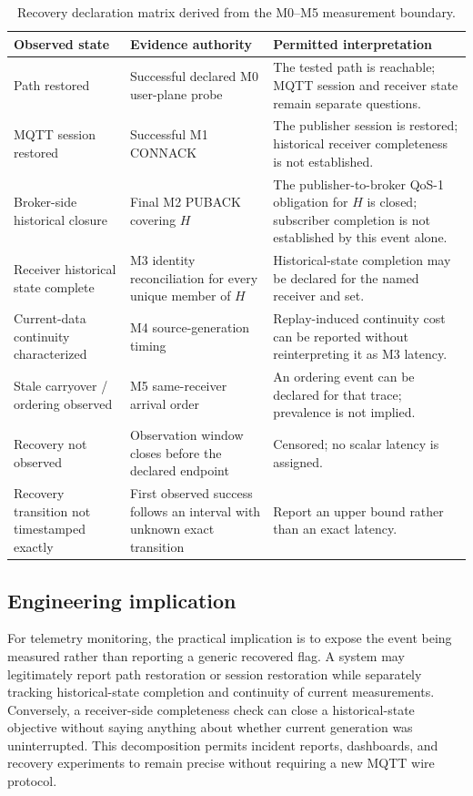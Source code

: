 \documentclass[journal]{IEEEtran}
\begin{document}
\begin{table}[t]
\centering
\small
\caption{Recovery declaration matrix derived from the M0--M5 measurement boundary.}
\label{tab:declaration}
\begin{tabular}{p{}p{}p{}}
\toprule
\textbf{Observed state} & \textbf{Evidence authority} & \textbf{Permitted interpretation} \\
\midrule
Path restored & Successful declared M0 user-plane probe & The tested path is reachable; MQTT session and receiver state remain separate questions. \\
MQTT session restored & Successful M1 CONNACK & The publisher session is restored; historical receiver completeness is not established. \\
Broker-side historical closure & Final M2 PUBACK covering $H$ & The publisher-to-broker QoS-1 obligation for $H$ is closed; subscriber completion is not established by this event alone. \\
Receiver historical state complete & M3 identity reconciliation for every unique member of $H$ & Historical-state completion may be declared for the named receiver and set. \\
Current-data continuity characterized & M4 source-generation timing & Replay-induced continuity cost can be reported without reinterpreting it as M3 latency. \\
Stale carryover / ordering observed & M5 same-receiver arrival order & An ordering event can be declared for that trace; prevalence is not implied. \\
Recovery not observed & Observation window closes before the declared endpoint & Censored; no scalar latency is assigned. \\
Recovery transition not timestamped exactly & First observed success follows an interval with unknown exact transition & Report an upper bound rather than an exact latency. \\
\bottomrule
\end{tabular}
\end{table}

\subsection{Engineering implication}

For telemetry monitoring, the practical implication is to expose the event being measured rather than reporting a generic recovered flag. A system may legitimately report path restoration or session restoration while separately tracking historical-state completion and continuity of current measurements. Conversely, a receiver-side completeness check can close a historical-state objective without saying anything about whether current generation was uninterrupted. This decomposition permits incident reports, dashboards, and recovery experiments to remain precise without requiring a new MQTT wire protocol.
\end{document}
